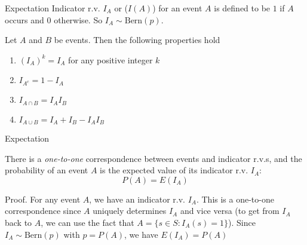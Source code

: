 \documentclass{beamer}
\newcommand{\ti}[1]{\textit{#1}}
\begin{document}
\begin{frame}{Expectation}
    Indicator r.v.  $I_A$ or ($I(A)$) for an event $A$ is defined to be $1$ if $A$ occurs and $0$ otherwise. So $I_A \sim \text{Bern}(p)$. 
    \begin{theorem}
        Let $A$ and $B$ be events. Then the following properties hold
        \begin{enumerate}
            \item $(I_A)^k = I_A$ for any positive integer $k$
            \item $I_{A^c} = 1 - I_A$
            \item $I_{A \cap B} = I_A I_B$
            \item $I_{A \cup B} = I_A + I_B - I_A I_B$
        \end{enumerate}
    \end{theorem}
\end{frame}

\begin{frame}{Expectation}
    \begin{theorem}
        There is a \ti{one-to-one} correspondence between events and indicator r.v.s, and the probability of an event $A$ is the expected value of its indicator r.v. $I_A$: 
        \[
        P(A) = E(I_A)
        \]
    \end{theorem}

    Proof. For any event $A$, we have an indicator r.v. $I_A$. This is a one-to-one correspondence since $A$ uniquely determines $I_A$ and vice versa (to get from $I_A$ back to $A$, we can use the fact that $A = \{s \in S: I_A(s) = 1\}$). Since $I_A \sim \text{Bern}(p)$ with $p = P(A)$, we have $E(I_A) = P(A)$
\end{frame}
\end{document}
